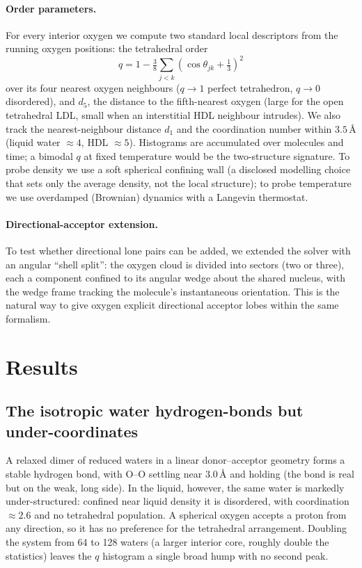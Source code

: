 \documentclass[11pt]{article}
\begin{document}
\paragraph{Order parameters.} For every interior oxygen we compute two standard local
descriptors from the running oxygen positions: the tetrahedral order
\[
q = 1 - \tfrac{3}{8}\sum_{j<k}\left(\cos\theta_{jk} + \tfrac13\right)^2
\]
over its four nearest oxygen neighbours ($q\!\to\!1$ perfect tetrahedron, $q\!\to\!0$
disordered), and $d_5$, the distance to the fifth-nearest oxygen (large for the open
tetrahedral LDL, small when an interstitial HDL neighbour intrudes). We also track the
nearest-neighbour distance $d_1$ and the coordination number within $3.5$\,\AA{} (liquid
water $\approx4$, HDL $\approx5$). Histograms are accumulated over molecules and time; a
bimodal $q$ at fixed temperature would be the two-structure signature. To probe density we
use a soft spherical confining wall (a disclosed modelling choice that sets only the average
density, not the local structure); to probe temperature we use overdamped (Brownian)
dynamics with a Langevin thermostat.

\paragraph{Directional-acceptor extension.} To test whether directional lone pairs can be
added, we extended the solver with an angular ``shell split'': the oxygen cloud is divided
into sectors (two or three), each a component confined to its angular wedge about the shared
nucleus, with the wedge frame tracking the molecule's instantaneous orientation. This is the
natural way to give oxygen explicit directional acceptor lobes within the same formalism.

\section{Results}

\subsection{The isotropic water hydrogen-bonds but under-coordinates}
A relaxed dimer of reduced waters in a linear donor--acceptor geometry forms a stable
hydrogen bond, with O--O settling near $3.0$\,\AA{} and holding (the bond is real but on the
weak, long side). In the liquid, however, the same water is markedly under-structured:
confined near liquid density it is disordered, with coordination $\approx2.6$ and no
tetrahedral population. A spherical oxygen accepts a proton from any direction, so it has no
preference for the tetrahedral arrangement. Doubling the system from 64 to 128 waters (a
larger interior core, roughly double the statistics) leaves the $q$ histogram a single broad
hump with no second peak.
\end{document}
